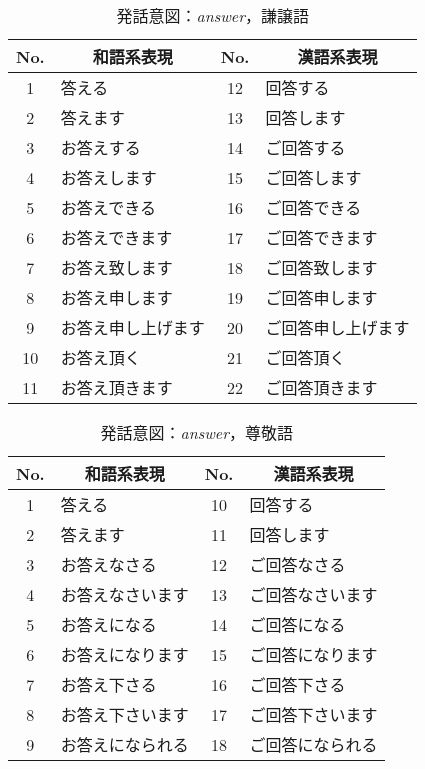 \makeatletter
 \renewcommand{\thetable}{}
 \makeatother

\begin{table}[htbp]
\begin{center} 
\setcounter{table}{0}
\caption{発話意図：{\it answer}，謙譲語} 
\label{tbl:table3.1} 
\begin{tabular}{|c||l|c||l|} 
\hline 
No. & \multicolumn{1}{|c|}{和語系表現} & No. & \multicolumn{1}{|c|}{漢語系表現} \\
\hline 
1&	答える&			12&	回答する \\
\hline 
2&	答えます&		13&	回答します \\
\hline 
3&	お答えする&		14&	ご回答する \\
\hline 
4&	お答えします&		15&	ご回答します \\
\hline 
5&	お答えできる&		16&	ご回答できる \\
\hline 
6&	お答えできます&		17&	ご回答できます \\
\hline 
7&	お答え致します&		18&	ご回答致します \\
\hline 
8&	お答え申します&		19&	ご回答申します \\
\hline 
9&	お答え申し上げます&	20&	ご回答申し上げます \\
\hline 
10&	お答え頂く&		21&	ご回答頂く \\
\hline 
11&	お答え頂きます&		22&	ご回答頂きます \\
\hline 
\end{tabular} 
\end{center} 
\end{table} 


\begin{table}[htbp]
\begin{center} 
\caption{発話意図：{\it answer}，尊敬語} 
\label{tbl:table3.2} 
\begin{tabular}{|c||l|c||l|} 
\hline 
No. & \multicolumn{1}{|c|}{和語系表現} & No. & \multicolumn{1}{|c|}{漢語系表現} \\
\hline 
1&	答える&			10&	回答する \\
\hline 
2&	答えます&		11&	回答します\\
\hline 
3&	お答えなさる&		12&	ご回答なさる\\
\hline 
4&	お答えなさいます&	13&	ご回答なさいます\\
\hline 
5&	お答えになる&		14&	ご回答になる\\
\hline 
6&	お答えになります&	15&	ご回答になります\\
\hline 
7&	お答え下さる&		16&	ご回答下さる\\
\hline 
8&	お答え下さいます&	17&	ご回答下さいます\\
\hline 
9&	お答えになられる&	18&	ご回答になられる\\
\hline 
\end{tabular} 
\end{center} 
\end{table} 


